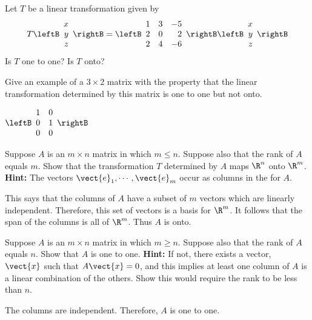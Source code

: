 \begin{enumialphparenastyle}
\begin{ex} Let $T$ be a linear transformation given by 
\[
T \leftB \begin{array}{r}
x\\
y \\
z
\end{array}\rightB = \leftB \begin{array}{rrr}
1 & 3 & -5  \\
2 & 0 & 2 \\
2 & 4 & -6 
\end{array}\rightB
 \leftB \begin{array}{r}
x\\
y \\
z
\end{array}\rightB 
\]
Is $T$ one to one? Is $T$ onto?
\end{ex}


\begin{ex} Give an example of a $3\times 2$ matrix with the property that the
linear transformation determined by this matrix is one to one but not onto. 
\begin{sol}
$\leftB
\begin{array}{cc}
1 & 0 \\
0 & 1 \\
0 & 0
\end{array}
\rightB $
\end{sol}
\end{ex}

\begin{ex} Suppose $A$ is an $m\times n$ matrix in which $m\leq n.$ Suppose also
that the rank of $A$ equals $m.$ Show that the transformation $T$ determined by $A$ 
maps $\R^{n}$ onto $\R^{m}$.
 \textbf{Hint: }The vectors $\vect{e}_{1},\cdots , \vect{e}_{m}$ occur as columns in the {\rref} for $A.$ \vspace{1mm} 
\begin{sol}
 This says
that the columns of $A$ have a subset of $m$ vectors which are linearly
independent. Therefore, this set of vectors is a basis for $\R^{m}$.
It follows that the span of the columns is all of $\R^{m}$. Thus $A$
is onto.
\end{sol}
\end{ex}

\begin{ex} Suppose $A$ is an $m\times n$ matrix in which $m\geq n.$ Suppose also
that the rank of $A$ equals $n.$ Show that $A$ is one to one. \textbf{Hint: }
If not, there exists a vector, $\vect{x}$ such that $A\vect{x}=0$, and
this implies at least one column of $A$ is a linear combination of the
others. Show this would require the rank to be less than $n.$ \vspace{1mm}
\begin{sol}
The
columns are independent. Therefore, $A$ is one to one.
\end{sol}
\end{ex}


\end{enumialphparenastyle}
